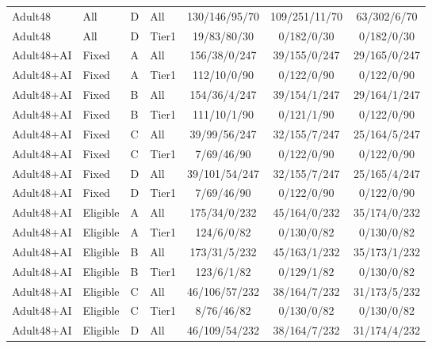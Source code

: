 \begin{longtable}{llllccc}
Adult48 & All & D & All & 130/146/95/70 & 109/251/11/70 & 63/302/6/70 \\

Adult48 & All & D & Tier1 & 19/83/80/30 & 0/182/0/30 & 0/182/0/30 \\

Adult48+AI & Fixed & A & All & 156/38/0/247 & 39/155/0/247 & 29/165/0/247 \\

Adult48+AI & Fixed & A & Tier1 & 112/10/0/90 & 0/122/0/90 & 0/122/0/90 \\

Adult48+AI & Fixed & B & All & 154/36/4/247 & 39/154/1/247 & 29/164/1/247 \\

Adult48+AI & Fixed & B & Tier1 & 111/10/1/90 & 0/121/1/90 & 0/122/0/90 \\

Adult48+AI & Fixed & C & All & 39/99/56/247 & 32/155/7/247 & 25/164/5/247 \\

Adult48+AI & Fixed & C & Tier1 & 7/69/46/90 & 0/122/0/90 & 0/122/0/90 \\

Adult48+AI & Fixed & D & All & 39/101/54/247 & 32/155/7/247 & 25/165/4/247 \\

Adult48+AI & Fixed & D & Tier1 & 7/69/46/90 & 0/122/0/90 & 0/122/0/90 \\

Adult48+AI & Eligible & A & All & 175/34/0/232 & 45/164/0/232 & 35/174/0/232 \\

Adult48+AI & Eligible & A & Tier1 & 124/6/0/82 & 0/130/0/82 & 0/130/0/82 \\

Adult48+AI & Eligible & B & All & 173/31/5/232 & 45/163/1/232 & 35/173/1/232 \\

Adult48+AI & Eligible & B & Tier1 & 123/6/1/82 & 0/129/1/82 & 0/130/0/82 \\

Adult48+AI & Eligible & C & All & 46/106/57/232 & 38/164/7/232 & 31/173/5/232 \\

Adult48+AI & Eligible & C & Tier1 & 8/76/46/82 & 0/130/0/82 & 0/130/0/82 \\

Adult48+AI & Eligible & D & All & 46/109/54/232 & 38/164/7/232 & 31/174/4/232 \\


\end{longtable}
